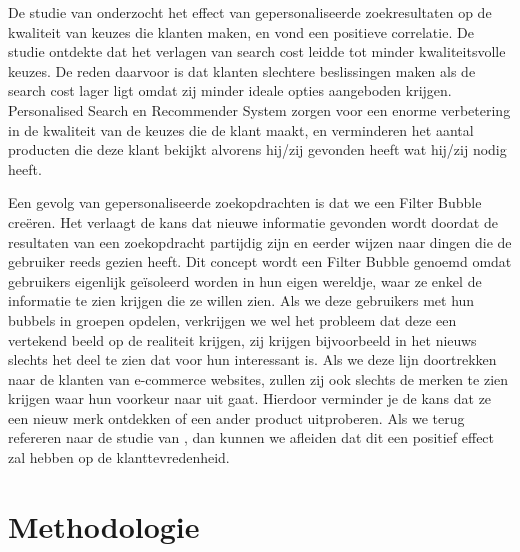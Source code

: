 De studie van \textcite{Diehl2003} onderzocht het effect van gepersonaliseerde zoekresultaten op de kwaliteit van keuzes die klanten maken, en vond een positieve correlatie. De studie ontdekte dat het verlagen van search cost \autocite{Smith1999} leidde tot minder kwaliteitsvolle keuzes. De reden daarvoor is dat klanten slechtere beslissingen maken als de search cost lager ligt omdat zij minder ideale opties aangeboden krijgen. Personalised Search en Recommender System zorgen voor een enorme verbetering in de kwaliteit van de keuzes die de klant maakt, en verminderen het aantal producten die deze klant bekijkt alvorens hij/zij gevonden heeft wat hij/zij nodig heeft.

Een gevolg van gepersonaliseerde zoekopdrachten is dat we een Filter Bubble \autocite{Pariser2011} creëren. Het verlaagt de kans dat nieuwe informatie gevonden wordt doordat de resultaten van een zoekopdracht partijdig zijn en eerder wijzen naar dingen die de gebruiker reeds gezien heeft. Dit concept wordt een Filter Bubble genoemd omdat gebruikers eigenlijk geïsoleerd worden in hun eigen wereldje, waar ze enkel de informatie te zien krijgen die ze willen zien. Als we deze gebruikers met hun bubbels in groepen opdelen, verkrijgen we wel het probleem dat deze een vertekend beeld op de realiteit krijgen, zij krijgen bijvoorbeeld in het nieuws slechts het deel te zien dat voor hun interessant is. Als we deze lijn doortrekken naar de klanten van e-commerce websites, zullen zij ook slechts de merken te zien krijgen waar hun voorkeur naar uit gaat. Hierdoor verminder je de kans dat ze een nieuw merk ontdekken of een ander product uitproberen. Als we terug refereren naar de studie van \textcite{Diehl2003}, dan kunnen we afleiden dat dit een positief effect zal hebben op de klanttevredenheid.



\section{Methodologie}
\label{sec:methodologie}

